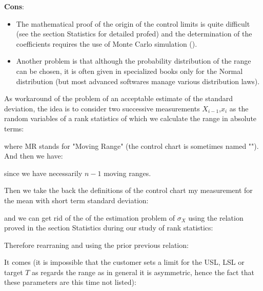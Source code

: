 	\textbf{Cons}:
	\begin{itemize}
		\item The mathematical proof of the origin of the control limits is quite difficult (see the section Statistics for detailed profed) and the determination of the coefficients requires the use of  Monte Carlo simulation (). 

		\item Another problem is that although the probability distribution of the range can be chosen, it is often given in specialized books only for the Normal distribution (but most advanced softwares manage various distribution laws).
 	\end{itemize}
 	As workaround of the problem of an acceptable estimate of the standard deviation, the idea is to consider two successive measurements $X_{i-1}$,$x_i$ as the random variables of a rank statistics of which we calculate the range in absolute terms:
	
	where MR stands for "Moving Range" (the control chart is sometimes named ""). And then we have:
	
	since we have necessarily $n-1$ moving ranges.

	Then we take the back the definitions of the control chart my measurement for the mean with short term standard deviation:
	
	and we can get rid of the of the estimation problem of $\sigma_X$ using the relation proved in the section Statistics during our study of rank statistics:
	
	Therefore rearraning and using the prior previous relation:
	
	It comes (it is impossible that the customer sets a limit for the USL, LSL or target $T$ as regards the range as in general it is asymmetric, hence the fact that these parameters are this time not listed):
	
